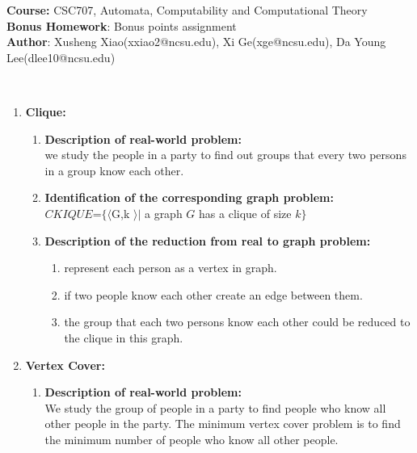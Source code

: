 \documentclass[article, 10pt,onecolumn]{article}
\begin{document}
\begin{flushleft}
\textbf{Course:} CSC707, Automata, Computability and Computational Theory\\
\textbf{Bonus Homework}: Bonus points assignment\\
\textbf{Author}: Xusheng Xiao(\small{xxiao2@ncsu.edu}), Xi Ge(\small{xge@ncsu.edu}), Da Young Lee(\small{dlee10@ncsu.edu})\\
\end{flushleft}

\begin{center}
\\
\end{center}
\noindent{\hrulefill}
\begin{enumerate}
\item \textbf{Clique:}
	\begin{enumerate}
	\item\textbf{Description of real-world problem:}\\ 
   we study the people in a party to find out groups that every two persons in a group know each other. 
  \item \textbf{Identification of the corresponding graph problem:}\\
  $CKIQUE$=$\{\langle $G,k $ \rangle | $ a graph $G$ has a clique of size $k\}$ 
  \item \textbf{Description of the reduction from real to graph problem:}
  	\begin{enumerate}
		\item represent each person as a vertex in graph.
		\item if two people know each other create an edge between them.
		\item the group that each two persons know each other could be reduced to the clique in this graph.
		\end{enumerate}
	\end{enumerate}	  
\item \textbf{Vertex Cover:}
  \begin{enumerate}
   \item \textbf{Description of real-world problem:}\\
   We study the group of people in a party to find people who
   know all other people in the party. The minimum vertex cover problem
   is to find the minimum number of people who know all other people.
   

\end{enumerate}
\end{enumerate}
\end{document}
